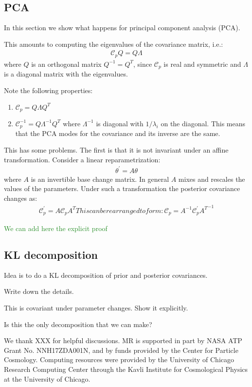 \documentclass[aps,nofootinbib,notitlepage,superscriptaddress,twocolumn,10pt,prd]{revtex4-1}
\newcommand{\mr}[1]{\textcolor{ForestGreen}{#1}}
\begin{document}
%
\subsection{PCA}
%
In this section we show what happens for principal component analysis (PCA).

This amounts to computing the eigenvalues of the covariance matrix, i.e.:
\begin{align}
\mathcal{C}_p Q = Q \Lambda
\end{align}
where $Q$ is an orthogonal matrix $Q^{-1} = Q^T$, since $\mathcal{C}_p$ is real and symmetric and $\Lambda$ is a diagonal matrix with the eigenvalues.

Note the following properties:
\begin{enumerate}
\item $\mathcal{C}_p = Q \Lambda Q^T$
\item $\mathcal{C}_p^{-1} = Q \Lambda^{-1} Q^T$ where $\Lambda^{-1}$ is diagonal with $1/\lambda_i$ on the diagonal. This means that the PCA modes for the covariance and its inverse are the same.
\end{enumerate}

This has some problems. The first is that it is not invariant under an affine transformation.
Consider a linear reparametrization:
\begin{align}
\theta^\prime = A \theta
\end{align}
where $A$ is an invertible base change matrix. In general $A$ mixes and rescales the values of the parameters.
Under such a transformation the posterior covariance changes as:
\begin{align}
\mathcal{C}_p^\prime = A \mathcal{C}_p A^T
This can be rearranged to form:
\mathcal{C}_p = A^{-1} \mathcal{C}_p^\prime {A^T}^{-1}

\end{align}

\mr{We can add here the explicit proof}

%
\subsection{KL decomposition}
%

Idea is to do a KL decomposition of prior and posterior covariances.

Write down the details.

This is covariant under parameter changes. Show it explicitly.

Is this the only decomposition that we can make?



%
\begin{acknowledgments}
%
We thank
XXX
for helpful discussions.
%
MR is supported in part by NASA ATP Grant No. NNH17ZDA001N, and by funds provided by the Center for Particle Cosmology.
%
Computing resources were provided by the University of Chicago Research Computing Center through the Kavli Institute for Cosmological Physics at the University of Chicago.
%
\end{acknowledgments}
%


%
\end{document}
